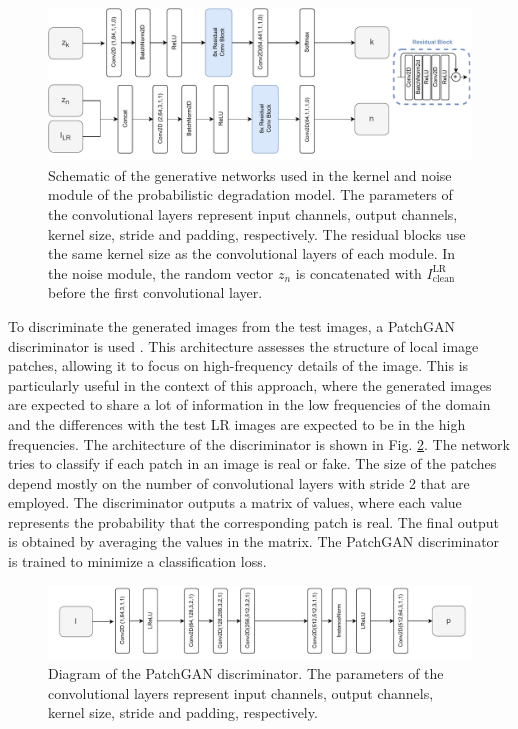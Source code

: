     \begin{figure}[H]
        \centering
        \includegraphics[width=\textwidth]{Includes/3-slim-gen-module.pdf}
        \caption{Schematic of the generative networks used in the kernel and noise module of the probabilistic degradation model.
        The parameters of the convolutional layers represent input channels, output channels, kernel size, stride and padding, respectively.
        The residual blocks use the same kernel size as the convolutional layers of each module. 
        In the noise module, the random vector $z_n$ is concatenated with $I_{\text{clean}}^{\text{LR}}$ before the first convolutional layer. }
        \label{fig:3-slim-gen-module}
    \end{figure}

    To discriminate the generated images from the test images, a PatchGAN discriminator is used \cite{isola2018imagetoimage}. This architecture assesses the structure of local image patches, allowing it to focus on high-frequency details of the image. This is particularly useful in the context of this approach, where the generated images are expected to share a lot of information in the low frequencies of the domain and the differences with the test  LR images are expected to be in the high frequencies. The architecture of the discriminator is shown in Fig. \ref{fig:3-slim-patchgan-module}.
    The network tries to classify if each patch in an image is real or fake. The size of the patches depend mostly on the number of convolutional layers with stride 2 that are employed.  The discriminator outputs a matrix of values, where each value represents the probability that the corresponding patch is real. The final output is obtained by averaging the values in the matrix. The PatchGAN discriminator is trained to minimize a classification loss. 

    \begin{figure}[H]
        \centering
        \includegraphics[width=\textwidth]{Includes/3-slim_patchGAN_architecture.pdf}
        \caption{Diagram of the PatchGAN discriminator.
                 The parameters of the convolutional layers represent input channels, output channels, kernel size, stride and padding, respectively. }
        \label{fig:3-slim-patchgan-module}
    \end{figure}

